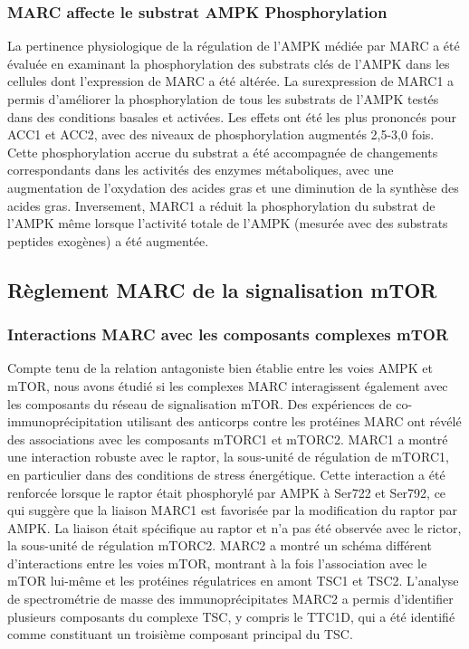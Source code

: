\documentclass[11pt,a4paper]{article}
\begin{document}
\subsubsection{MARC affecte le substrat AMPK Phosphorylation}

La pertinence physiologique de la régulation de l'AMPK médiée par MARC a été évaluée en examinant la phosphorylation des substrats clés de l'AMPK dans les cellules dont l'expression de MARC a été altérée. La surexpression de MARC1 a permis d'améliorer la phosphorylation de tous les substrats de l'AMPK testés dans des conditions basales et activées. Les effets ont été les plus prononcés pour ACC1 et ACC2, avec des niveaux de phosphorylation augmentés 2,5-3,0 fois. Cette phosphorylation accrue du substrat a été accompagnée de changements correspondants dans les activités des enzymes métaboliques, avec une augmentation de l'oxydation des acides gras et une diminution de la synthèse des acides gras. Inversement, MARC1 a réduit la phosphorylation du substrat de l'AMPK même lorsque l'activité totale de l'AMPK (mesurée avec des substrats peptides exogènes) a été augmentée.

\subsection{Règlement MARC de la signalisation mTOR}

\subsubsection{Interactions MARC avec les composants complexes mTOR}

Compte tenu de la relation antagoniste bien établie entre les voies AMPK et mTOR, nous avons étudié si les complexes MARC interagissent également avec les composants du réseau de signalisation mTOR. Des expériences de co-immunoprécipitation utilisant des anticorps contre les protéines MARC ont révélé des associations avec les composants mTORC1 et mTORC2. MARC1 a montré une interaction robuste avec le raptor, la sous-unité de régulation de mTORC1, en particulier dans des conditions de stress énergétique. Cette interaction a été renforcée lorsque le raptor était phosphorylé par AMPK à Ser722 et Ser792, ce qui suggère que la liaison MARC1 est favorisée par la modification du raptor par AMPK. La liaison était spécifique au raptor et n'a pas été observée avec le rictor, la sous-unité de régulation mTORC2. MARC2 a montré un schéma différent d'interactions entre les voies mTOR, montrant à la fois l'association avec le mTOR lui-même et les protéines régulatrices en amont TSC1 et TSC2. L'analyse de spectrométrie de masse des immunoprécipitates MARC2 a permis d'identifier plusieurs composants du complexe TSC, y compris le TTC1D, qui a été identifié comme constituant un troisième composant principal du TSC.
\end{document}
